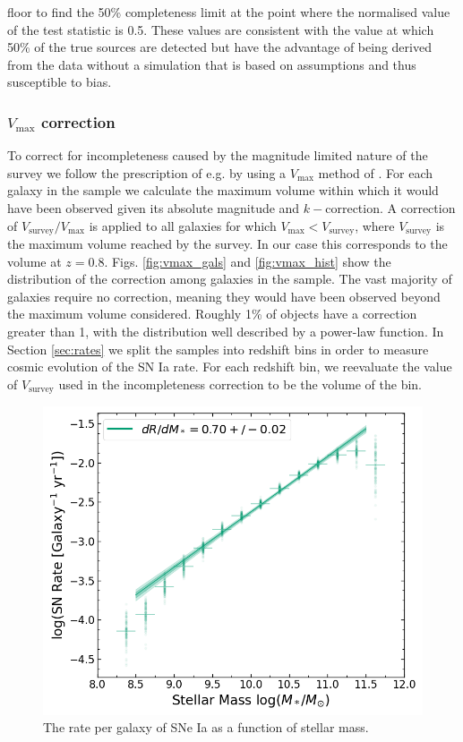 \documentclass[fleqn,usenatbib]{mnras}
\begin{document}
floor to find the 50\% completeness limit at the point where the normalised value of the test statistic is 0.5. These values are consistent with the value at which 50\% of the true sources are detected but have the advantage of being derived from the data without a simulation that is based on assumptions and thus susceptible to bias.

\subsubsection{$V_{\mathrm{max}}$ correction \label{subsubsec:vmax_corr}}

To correct for incompleteness caused by the magnitude limited nature of the survey we follow the prescription of e.g. \citet{Sullivan2006, Smith2012} by using a $V_{\mathrm{max}}$ method of \citet{Schmid1968}. For each galaxy in the sample we calculate the maximum volume within which it would have been observed given its absolute magnitude and $k-$correction. A correction of $V_{\mathrm{survey}}/V_{\mathrm{max}}$ is applied to all galaxies for which $V_{\mathrm{max}} < V_{\mathrm{survey}}$, where $V_{\mathrm{survey}}$ is the maximum volume reached by the survey. In our case this corresponds to the volume at $z=0.8$. Figs. \ref{fig:vmax_gals} and \ref{fig:vmax_hist} show the distribution of the correction among galaxies in the sample. The vast majority of galaxies require no correction, meaning they would have been observed beyond the maximum volume considered. Roughly 1\% of objects have a correction greater than 1, with the distribution well described by a power-law function. In Section \ref{sec:rates} we split the samples into redshift bins in order to measure cosmic evolution of the SN Ia rate. For each redshift bin, we reevaluate the value of $V_{\mathrm{survey}}$ used in the incompleteness correction to be the volume of the bin.


\begin{figure}
    \centering
    \includegraphics[width=.5\textwidth]{figs/rate_vs_mass_all.png}
    \caption{The rate per galaxy of SNe Ia as a function of stellar mass.}%
    \label{fig:rate_raw}
\end{figure}
\end{document}
